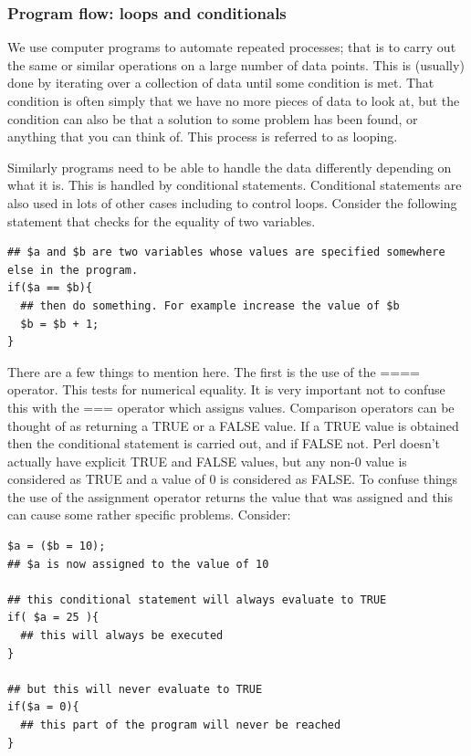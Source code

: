 \documentclass[11pt]{article}
\begin{document}
\subsubsection{Program flow: loops and conditionals}
\label{sec-5-4}


We use computer programs to automate repeated processes; that is to
carry out the same or similar operations on a large number of data
points. This is (usually) done by iterating over a collection of data
until some condition is met. That condition is often simply that we have
no more pieces of data to look at, but the condition can also be that a
solution to some problem has been found, or anything that you can think
of. This process is referred to as looping.

Similarly programs need to be able to handle the data differently
depending on what it is. This is handled by conditional statements.
Conditional statements are also used in lots of other cases including to
control loops. Consider the following statement that checks for the
equality of two variables.


\begin{verbatim}
## $a and $b are two variables whose values are specified somewhere else in the program.
if($a == $b){
  ## then do something. For example increase the value of $b
  $b = $b + 1;
}
\end{verbatim}

There are a few things to mention here. The first is the use of the ====
operator. This tests for numerical equality. It is very important not to
confuse this with the === operator which assigns values. Comparison
operators can be thought of as returning a TRUE or a FALSE value. If a
TRUE value is obtained then the conditional statement is carried out,
and if FALSE not. Perl doesn't actually have explicit TRUE and FALSE
values, but any non-0 value is considered as TRUE and a value of 0 is
considered as FALSE. To confuse things the use of the assignment
operator returns the value that was assigned and this can cause some
rather specific problems. Consider:


\begin{verbatim}
$a = ($b = 10);
## $a is now assigned to the value of 10

## this conditional statement will always evaluate to TRUE
if( $a = 25 ){
  ## this will always be executed
}

## but this will never evaluate to TRUE
if($a = 0){
  ## this part of the program will never be reached
}
\end{verbatim}
\end{document}
